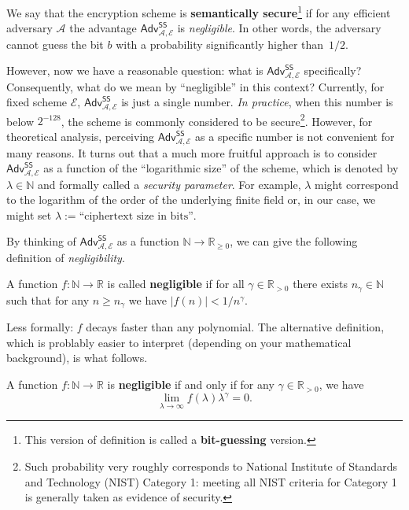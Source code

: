 \documentclass[../../book.tex]{subfiles}
\begin{document}
We say that the encryption scheme is \textbf{semantically secure}\footnote{This version of definition is called a 
\textbf{bit-guessing} version.} if for any efficient adversary $\mathcal{A}$ the advantage $\textsf{Adv}^{\textsf{SS}}_{\mathcal{A},\mathcal{E}}$ 
is \emph{negligible}. In other words, the adversary cannot guess the bit $b$ with a probability significantly higher than~$1/2$.

However, now we have a reasonable question: what is $\textsf{Adv}^{\textsf{SS}}_{\mathcal{A},\mathcal{E}}$ specifically?
Consequently, what do we mean by ``negligible'' in this context?
Currently, for fixed scheme $\mathcal{E}$, $\textsf{Adv}^{\textsf{SS}}_{\mathcal{A},\mathcal{E}}$ is just a single number.
\emph{In practice}, when this number is below $2^{-128}$, the scheme is commonly considered to be secure\footnote{Such probability very roughly corresponds to National Institute of Standards and Technology (NIST) Category 1: meeting all NIST criteria for Category 1 is generally taken as evidence of security.}.
However, for theoretical analysis, perceiving $\textsf{Adv}^{\textsf{SS}}_{\mathcal{A},\mathcal{E}}$ as a specific number is not convenient for many reasons.
It turns out that a much more fruitful approach is to consider $\textsf{Adv}^{\textsf{SS}}_{\mathcal{A},\mathcal{E}}$ as a function of the ``logarithmic size'' of the scheme, which is denoted by $\lambda \in \mathbb{N}$ and formally called a \textit{security parameter}.
For example, $\lambda$ might correspond to the logarithm of the order of the underlying finite field or, in our case, we might set $\lambda := \text{``ciphertext size in bits''}$.

By thinking of $\textsf{Adv}^{\textsf{SS}}_{\mathcal{A},\mathcal{E}}$ as a function $\mathbb{N} \to \mathbb{R}_{\geq 0}$, we can give the following definition of \textit{negligibility}.

\begin{definition}
    A function $f: \mathbb{N} \to \mathbb{R}$ is called \textbf{negligible} if for all $\gamma \in \mathbb{R}_{>0}$ there exists $n_{\gamma} \in \mathbb{N}$ such that for any $n \geq n_{\gamma}$ we have $|f(n)| < 1/n^{\gamma}$.
\end{definition}

Less formally: $f$ decays faster than any polynomial. 
The alternative definition, which is problably easier to interpret (depending on your mathematical background), is what follows.

\begin{theorem}
    A function $f: \mathbb{N} \to \mathbb{R}$ is \textbf{negligible} if and only if for any $\gamma \in \mathbb{R}_{>0}$, we have
    \begin{equation*}
        \lim_{\lambda \to \infty} f(\lambda)\lambda^{\gamma} = 0.
    \end{equation*}
\end{theorem}
\end{document}
